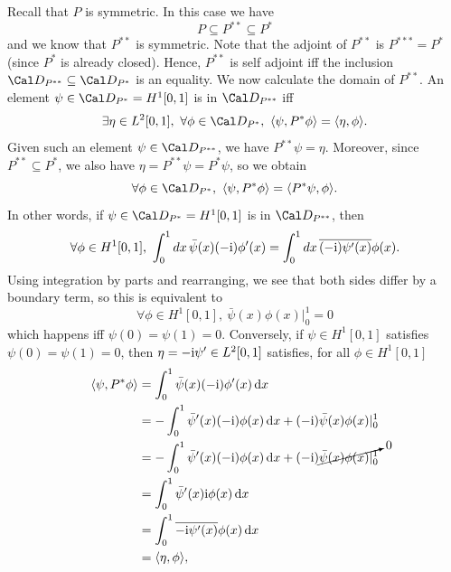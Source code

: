 Recall that \(P\) is symmetric.
In this case we have
\begin{equation}
  P\subseteq P^{**}\subseteq P^{*}
\end{equation}
and we know that \(P^{**}\) is symmetric.
Note that the adjoint of \(P^{**}\) is \(P^{***}=P^{*}\)
(since \(P^{*}\) is already closed).
Hence, \(P^{**}\) is self adjoint iff the inclusion \(\Cal
D_{P^{**}}\subseteq \Cal D_{P^*}\) is an equality.
We now calculate the domain of \(P^{**}\).
An element \(\psi\in \Cal D_{P^*}=H^{1}[0,1]\) is in \(\Cal
D_{P^{**}}\) iff
\begin{equation}
  \exists\eta\in L^{2}[0,1], \
  \forall\phi\in\Cal D_{P^*}, \
  \langle \psi, P^{*}\phi \rangle
  =
  \langle \eta, \phi\rangle
.\end{equation}
Given such an element \(\psi\in\Cal D_{P^{**}}\), we have \(P^{**}\psi=\eta\).
Moreover, since \(P^{**}\subseteq P^*\), we also have
\(\eta=P^{**}\psi=P^*\psi\), so we obtain
\begin{equation}
  \forall\phi\in\Cal D_{P^*}, \
  \langle \psi, P^{*}\phi \rangle
  =
  \langle P^{*}\psi, \phi\rangle
.\end{equation}
In other words, if \(\psi\in\Cal D_{P^*}=H^{1}[0,1]\) is in \(\Cal
D_{P^{**}}\), then
\begin{equation}
  \forall\phi\in H^{1}[0,1], \
  \int_{0}^{1} dx\, \bar\psi(x)(-\mathrm{i})\phi'(x)
  =
  \int_{0}^{1} dx\, \overline{(-\mathrm{i})\psi'(x)}\phi(x)
.\end{equation}
Using integration by parts and rearranging, we see that both sides
differ by a boundary term, so this is equivalent to
\begin{equation}
  \forall\phi\in H^{1}[0,1], \
  \bar\psi(x)\phi(x)|_{0}^{1} = 0
\end{equation}
which happens iff \(\psi(0)=\psi(1)=0\).
Conversely, if \(\psi\in H^{1}[0,1]\) satisfies \(\psi(0)=\psi(1)=0\),
then \(\eta=-\mathrm{i}\psi'\in L^{2}[0,1]\) satisfies, for all \(\phi\in
H^{1}[0,1]\)
\begin{align}
  \langle \psi, P^{*}\phi \rangle
  &= \int_{0}^{1} \bar\psi(x)(-\mathrm{i})\phi'(x)\mathop{}\!\mathrm{d} x \\
  &= -\int_{0}^{1} \bar\psi'(x)(-\mathrm{i})\phi(x)\mathop{}\!\mathrm{d} x
  + (-\mathrm{i})\bar\psi(x)\phi(x)|_{0}^{1} \\
  &= -\int_{0}^{1} \bar\psi'(x)(-\mathrm{i})\phi(x)\mathop{}\!\mathrm{d} x
  + (-\mathrm{i})\cancelto{0}{\bar\psi(x)\phi(x)|_{0}^{1}} \\
  &= \int_{0}^{1} \bar\psi'(x)\mathrm{i}\phi(x)\mathop{}\!\mathrm{d} x \\
  &= \int_{0}^{1} \overline{-\mathrm{i}\psi'(x)}\phi(x)\mathop{}\!\mathrm{d} x \\
  &= \langle \eta,\phi\rangle
,\end{align}
